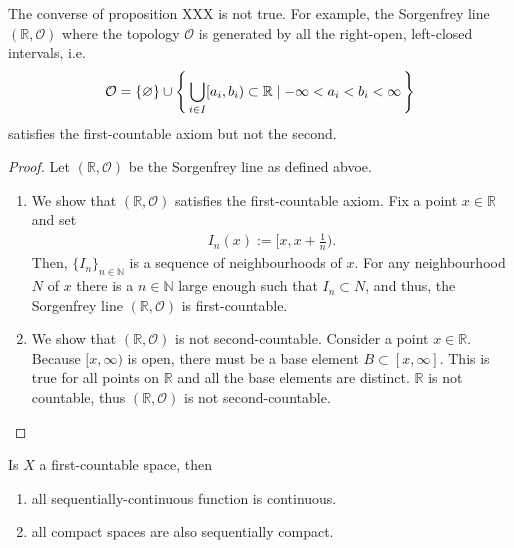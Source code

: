 \begin{exmbox}
    \begin{example}
        The converse of proposition XXX is not true. For example, the Sorgenfrey line \((\mathbb{R}, \mathcal{O})\) where the topology \(\mathcal{O}\) is generated by all the right-open, left-closed intervals, i.e.
        \begin{align*}
            \mathcal{O} = \{\varnothing\} \cup \left\{\, \bigcup_{i \in I} [a_i, b_i) \subset \mathbb{R} \mid -\infty < a_i < b_i < \infty \,\right\}
        \end{align*}
        satisfies the first-countable axiom but not the second.
    \end{example}
\end{exmbox}
%
\begin{proof}
    Let \((\mathbb{R}, \mathcal{O})\) be the Sorgenfrey line as defined abvoe.
    \begin{enumerate}
        \item We show that \((\mathbb{R}, \mathcal{O})\) satisfies the first-countable axiom. Fix a point \(x \in \mathbb{R}\) and set
        \begin{align*}
            I_n(x) := \bigg[x, x + \frac{1}{n}\bigg) \text{.}
        \end{align*}
        Then, \(\{I_n\}_{n \in \mathbb{N}}\) is a sequence of neighbourhoods of \(x\). For any neighbourhood \(N\) of \(x\) there is a \(n \in \mathbb{N}\) large enough such that \(I_n \subset N\), and thus, the Sorgenfrey line \((\mathbb{R}, \mathcal{O})\) is first-countable.
        \item We show that \((\mathbb{R}, \mathcal{O})\) is not second-countable. Consider a point \(x \in \mathbb{R}\). Because \([x, \infty)\) is open, there must be a base element \(B \subset [x, \infty]\). This is true for all points on \(\mathbb{R}\) and all the base elements are distinct. \(\mathbb{R}\) is not countable, thus \((\mathbb{R}, \mathcal{O})\) is not second-countable.
    \end{enumerate}
\end{proof}
%
\begin{thmbox}
    \begin{lemma}
        Is \(X\) a first-countable space, then
        \begin{enumerate}
            \item all sequentially-continuous function is continuous.
            \item all compact spaces are also sequentially compact.
        \end{enumerate}
    \end{lemma}
\end{thmbox}

